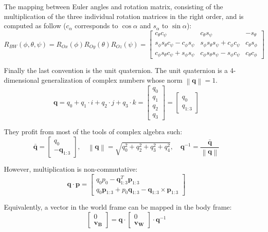 \documentclass[a4paper, 12pt]{report}
\newcommand\norm[1]{\left\lVert#1\right\rVert}
\begin{document}
The mapping between Euler angles and rotation matrix, consisting of the multiplication of the three individual rotation matrices in the right order, and is computed as follow ($c_\alpha$ corresponds to $\cos{\alpha}$ and $s_\alpha$ to $\sin{\alpha}$):
\[R_{BW}(\phi, \theta, \psi)= R_{Ox}(\phi) R_{Oy}(\theta) R_{Oz}(\psi)  = 
\begin{bmatrix}  c_\theta c_\psi  & c_\theta s_\psi  & -s_\theta  \\ s_\phi s_\theta c_\psi -c_\phi s_\psi  & s_\phi s_\theta s_\psi  + c_\phi c_\psi  & c_\theta s_\phi  \\ c_\phi s_\theta c_\psi +s_\phi s_\psi  & c_\phi s_\theta s_\psi -s_\phi c_\psi  & c_\theta c_\phi  \end{bmatrix} \]

Finally the last convention is the unit quaternion. The unit quaternion is a 4-dimensional generalization of complex numbers whose norm $\norm{\boldsymbol{q}} = 1$.
\[ \boldsymbol{q} =  q_0 + q_1 \cdot i + q_2 \cdot j + q_3 \cdot k = \begin{bmatrix} q_0 \\ q_1 \\ q_2 \\ q_3 \end{bmatrix} = \begin{bmatrix} q_0 \\ q_{1:3} \end{bmatrix} \]

They profit from most of the tools of complex algebra such:
\[ \boldsymbol{\bar q} = \begin{bmatrix} q_0 \\ -\boldsymbol{q}_{1:3} \end{bmatrix},  \quad \norm{\boldsymbol{q}} = \sqrt{q_0^2 + q_2^2 + q_3^2 + q_4^2}, \quad \boldsymbol{q}^{-1} = \frac{\boldsymbol{\bar q}}{ \norm{\boldsymbol{q}}} \]

However, multiplication is non-commutative:
\[\boldsymbol{q} \cdot \boldsymbol{p} = \begin{bmatrix} q_0p_0 - \boldsymbol{q}^T_{1:3}\boldsymbol{p}_{1:3} \\ q_0\boldsymbol{p}_{1:3} + p_0\boldsymbol{q}_{1:3} - \boldsymbol{q}_{1:3} \times \boldsymbol{p}_{1:3} \end{bmatrix} \]

Equivalently, a vector in the world frame can be mapped in the body frame:
\[ \begin{bmatrix} 0 \\ \boldsymbol{v_B} \end{bmatrix}  = \boldsymbol{q} \cdot \begin{bmatrix} 0 \\ \boldsymbol{v_W} \end{bmatrix} \cdot \boldsymbol{q}^{-1} \]
\end{document}
